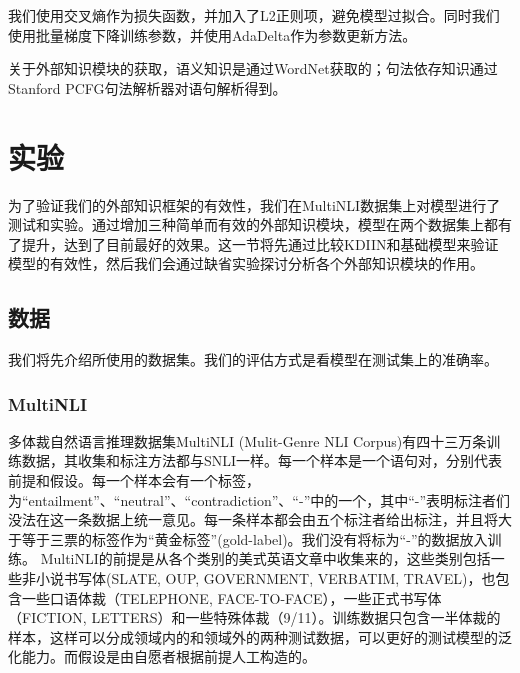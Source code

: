 \documentclass[UTF8,11pt,a4paper,nofonts]{ctexart}
\begin{document}
我们使用交叉熵作为损失函数，并加入了L2正则项，避免模型过拟合。同时我们使用批量梯度下降训练参数，并使用AdaDelta\cite{Zeiler2012ADADELTAAA}作为参数更新方法。

关于外部知识模块的获取，语义知识是通过WordNet获取的；句法依存知识通过Stanford PCFG句法解析器对语句解析得到。



\section{实验}
为了验证我们的外部知识框架的有效性，我们在MultiNLI数据集上对模型进行了测试和实验。通过增加三种简单而有效的外部知识模块，模型在两个数据集上都有了提升，达到了目前最好的效果。这一节将先通过比较KDIIN和基础模型来验证模型的有效性，然后我们会通过缺省实验探讨分析各个外部知识模块的作用。

\subsection{数据}
我们将先介绍所使用的数据集。我们的评估方式是看模型在测试集上的准确率。


\subsubsection{MultiNLI} 多体裁自然语言推理数据集MultiNLI (Mulit-Genre NLI Corpus)\cite{Nangia2017TheR2}有四十三万条训练数据，其收集和标注方法都与SNLI一样。每一个样本是一个语句对，分别代表前提和假设。每一个样本会有一个标签，为“entailment”、“neutral”、“contradiction”、“-”中的一个，其中“-”表明标注者们没法在这一条数据上统一意见。每一条样本都会由五个标注者给出标注，并且将大于等于三票的标签作为“黄金标签”(gold-label)。我们没有将标为“-”的数据放入训练。
MultiNLI的前提是从各个类别的美式英语文章中收集来的，这些类别包括一些非小说书写体(SLATE, OUP, GOVERNMENT, VERBATIM, TRAVEL)，也包含一些口语体裁（TELEPHONE, FACE-TO-FACE），一些正式书写体（FICTION, LETTERS）和一些特殊体裁（9/11）。训练数据只包含一半体裁的样本，这样可以分成领域内的和领域外的两种测试数据，可以更好的测试模型的泛化能力。而假设是由自愿者根据前提人工构造的。
\end{document}
